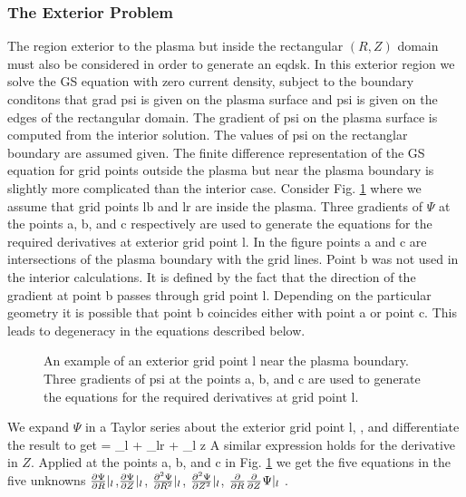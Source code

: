 \subsubsection{The Exterior Problem}

The region exterior to the plasma but inside the rectangular $(R,Z)$ domain must
also be considered in order to generate an eqdsk. In this exterior region we
solve the GS equation with zero current density, subject to the boundary
conditons that grad psi is given on the plasma surface and psi is given on the
edges of the rectangular domain. The gradient of psi on the plasma surface is
computed from the interior solution. The values of psi on the rectanglar
boundary are assumed given. The finite difference representation of the GS
equation for grid points outside the plasma but near the plasma boundary is
slightly more complicated than the interior case. Consider Fig. \ref{f1e} where
we assume that grid points lb and lr are inside the plasma. Three gradients of
$\Psi$ at the points a, b, and c respectively are used to generate the equations
for the required derivatives at exterior grid point l. In the figure points a
and c are intersections of the plasma boundary with the grid lines. Point b was
not used in the interior calculations. It is defined by the fact that the
direction of the gradient at point b passes through grid point l. Depending on
the particular geometry it is possible that point b coincides either with point
a or point c. This leads to degeneracy in the equations described below.

\begin{figure}[hbt] %
 \centering 
 \mbox{}
 \caption{An example of an exterior grid point l near the plasma boundary. Three
 gradients of psi at the points a, b, and c  are used to generate the equations
 for the required derivatives at grid point l.} 
 \label{f1e}
\end{figure}

We expand $\Psi$ in a Taylor series about the exterior grid point l,
, and differentiate the result to get
\beq \label{e2}
  = \Biggr \vert_l
  + \Biggr \vert_lr
  + \Psi  \Biggr \vert_l z
\eeq
A similar expression holds for the derivative in $Z$. Applied at the
points a, b, and c in Fig. \ref{f1e} we get the five equations in the five
unknowns $\frac{\partial{ \Psi}}{\partial{ R}}\vert_l$,$\frac{\partial{ \Psi}}{\partial{ Z}}\vert_l$,
$\frac{\partial^{2}{\Psi}}{\partial{ R}^{2}}\vert_l$, $\frac{\partial^{2}{\Psi}}{\partial{ Z}^{2}}\vert_l$,
$\frac{\partial}{\partial R}\frac{\partial}{\partial Z}\Psi \vert_l $ .

